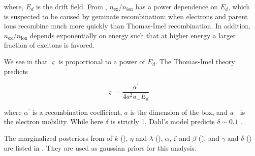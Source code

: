 \noindent where, $E_d$ is the drift field.  From ,
$n_{\mathrm{ex}} / n_{\mathrm{ion}}$ has a power dependence on $E_d$,
which is suspected to be caused by geminate recombination: when electrons and parent ions recombine much more quickly than Thomas-Imel
recombination.  In addition, $n_{\mathrm{ex}} / n_{\mathrm{ion}}$ depends exponentially on energy such that at higher energy a larger
fraction of excitons is favored.

We see in  that $\varsigma$ is proportional to a power of $E_d$.  The
Thomas-Imel theory predicts

\vspace{-15pt}

\begin{equation}
\varsigma = \frac{\alpha^{\prime}}{4 a^2 u_- E_d}
\end{equation}

\noindent where $\alpha ^{\prime}$ is a recombination coefficient, $a$ is the dimension of the box, and $u_-$ is the electron
mobility.  While here $\delta$ is strictly 1, Dahl's model predicts $\delta \sim 0.1$ .

The marginalized posteriors from  of $k$ (), $\eta$ and
$\lambda$ (), $\alpha$, $\zeta$ and $\beta$
(), and $\gamma$ and $\delta$
() are listed in
.  They are used as gaussian priors for this analysis.

